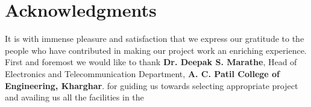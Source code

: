 \chapter*{Acknowledgments}
\thispagestyle{empty}

It is with immense pleasure and satisfaction that we express our gratitude to the people who have contributed in making our project work an enriching experience. First and foremost we would like to thank \textbf{Dr. Deepak S. Marathe}, Head of Electronics and Telecommunication Department, \textbf{A. C. Patil College of Engineering, Kharghar}. for guiding us towards selecting appropriate project and availing us all the facilities in the